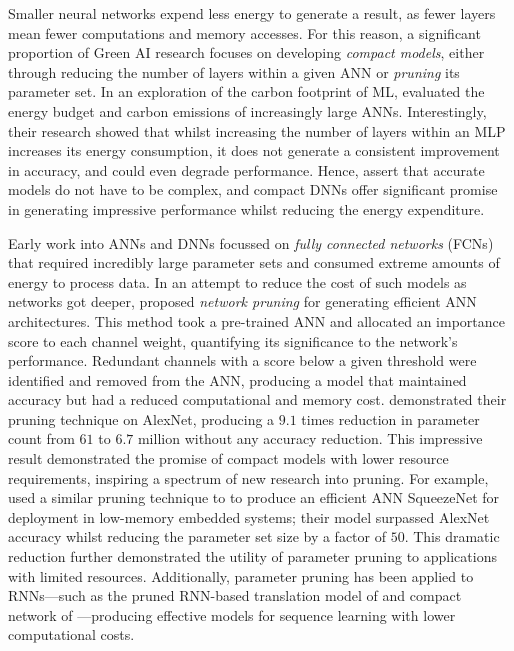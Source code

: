\documentclass[a4paper, 11pt]{report}
\begin{document}
    Smaller neural networks expend less energy to generate a result, as fewer layers mean fewer computations and memory accesses. For this reason, a significant proportion of Green AI research focuses on developing \emph{compact models}, either through reducing the number of layers within a given ANN or \emph{pruning} its parameter set. In an exploration of the carbon footprint of ML, \citet{lottick-2019} evaluated the energy budget and carbon emissions of increasingly large ANNs. Interestingly, their research showed that whilst increasing the number of layers within an MLP increases its energy consumption, it does not generate a consistent improvement in accuracy, and could even degrade performance. Hence, \citet{lottick-2019} assert that accurate models do not have to be complex, and compact DNNs offer significant promise in generating impressive performance whilst reducing the energy expenditure.

    Early work into ANNs and DNNs focussed on \emph{fully connected networks} (FCNs) that required incredibly large parameter sets and consumed extreme amounts of energy to process data. In an attempt to reduce the cost of such models as networks got deeper, \citet{han-2015} proposed \emph{network pruning} for generating efficient ANN architectures. This method took a pre-trained ANN and allocated an importance score to each channel weight, quantifying its significance to the network's performance. Redundant channels with a score below a given threshold were identified and removed from the ANN, producing a model that maintained accuracy but had a reduced computational and memory cost. \citet{han-2015} demonstrated their pruning technique on AlexNet, producing a $9.1$ times reduction in parameter count from $61$ to $6.7$ million without any accuracy reduction. This impressive result demonstrated the promise of compact models with lower resource requirements, inspiring a spectrum of new research into pruning. For example, \citet{iandola-2016} used a similar pruning technique to \citet{han-2015} to produce an efficient ANN SqueezeNet for deployment in low-memory embedded systems; their model surpassed AlexNet accuracy whilst reducing the parameter set size by a factor of $50$. This dramatic reduction further demonstrated the utility of parameter pruning to applications with limited resources. Additionally, parameter pruning has been applied to RNNs---such as the pruned RNN-based translation model of \citet{see-2016} and compact network of \citet{narang-2017}---producing effective models for sequence learning with lower computational costs.
\end{document}
